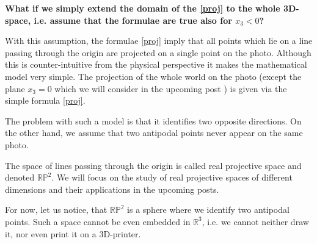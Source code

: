 \documentclass[a4paper,10pt]{article}
\begin{document}
{\bf What if we simply extend the domain of the \eqref{proj} to the whole 3D-space, i.e. assume that the formulae are true also for $x_3 < 0$?} 

With this assumption, the formulae \eqref{proj} imply that all points which lie on a line passing through the origin are projected on a single point on the photo. Although this is counter-intuitive  from the physical perspective it makes the mathematical model very simple. The projection of the whole world on the photo (except the plane $x_3=0$ which we will consider in the upcoming post ) is given via the simple formula \eqref{proj}. 

The problem with such a model is that it identifies two opposite directions. On the other hand, we assume that two antipodal points never appear on the same photo.

The space of lines passing through the origin is called real projective space and denoted $\mathbb{RP}^2$. We will focus on the study of real projective spaces of different dimensions and their applications in the upcoming posts.

For now, let us notice, that $\mathbb{RP}^2$ is a sphere where we identify two antipodal points. Such a space cannot be even embedded in $\mathbb{R}^3$, i.e. we cannot neither draw it,  nor even print it on a 3D-printer.
\end{document}
